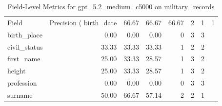\begin{table}
\caption{Field-Level Metrics for gpt_5.2_medium_c5000 on military_records}
\label{tab:fields_gpt_5.2_medium_c5000_military_records}
\begin{tabular}{lrrrrrr}
\toprule
Field & Precision (%
\midrule
birth_date & 66.67 & 66.67 & 66.67 & 2 & 1 & 1 \\
birth_place & 0.00 & 0.00 & 0.00 & 0 & 3 & 3 \\
civil_status & 33.33 & 33.33 & 33.33 & 1 & 2 & 2 \\
first_name & 25.00 & 33.33 & 28.57 & 1 & 3 & 2 \\
height & 25.00 & 33.33 & 28.57 & 1 & 3 & 2 \\
profession & 0.00 & 0.00 & 0.00 & 0 & 3 & 3 \\
surname & 50.00 & 66.67 & 57.14 & 2 & 2 & 1 \\
\bottomrule
\end{tabular}
\end{table}
